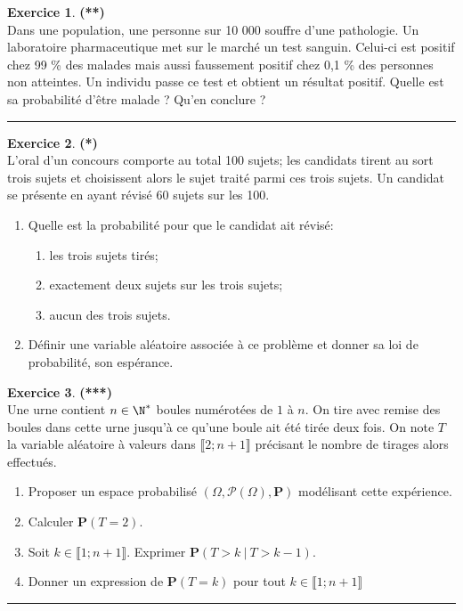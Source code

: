 \documentclass[a4paper,11pt]{article}
\theoremstyle{definition}
\newtheorem{exo}{Exercice} %
\newcommand{\Pb}{\mathbf{P}}
\begin{document}
\begin{exo}\textbf{(**)}\quad\\[0.15cm]%
	Dans une population, une personne sur 10 000 souffre d'une pathologie. Un
	laboratoire pharmaceutique met sur le marché un test sanguin. Celui-ci est positif
	chez 99 \% des malades mais aussi faussement positif chez 0,1 \% des personnes non
	atteintes. Un individu passe ce test et obtient un résultat positif.
	Quelle est sa probabilité d'être malade ? Qu'en conclure ?
	
	
	\centering
	\rule{1\linewidth}{0.6pt}
\end{exo}


\begin{exo}\textbf{(*)}\quad\\[0.15cm]%
	L'oral d'un concours comporte au total 100 sujets; les candidats
	tirent au sort trois sujets et choisissent alors le sujet traité parmi
	ces trois sujets. Un candidat se présente en ayant révisé 60
	sujets sur les 100.
	\begin{enumerate}
		\item Quelle est la probabilité pour que le candidat ait révisé:
		\begin{enumerate}
			\item les trois sujets tirés;
			\item exactement deux sujets sur les trois sujets;
			\item aucun des trois sujets.
		\end{enumerate}
		\item Définir une variable aléatoire associée à ce problème 
		et donner sa loi de probabilité, son espérance.
	\end{enumerate}
	
\end{exo}


\begin{exo}\textbf{(***)}\quad\\[0.25cm]%
	Une urne contient $n \in \N^*$ boules numérotées de $1$ à $n $. On tire avec remise des
	boules dans cette urne jusqu'à ce qu'une boule ait été tirée deux fois. On note $T$
	la variable aléatoire à valeurs dans $\llbracket2 ; n + 1\rrbracket$ précisant le nombre de tirages alors	effectués.
	\begin{enumerate}
		\item Proposer un espace probabilisé $(\Omega, \mathcal P(\Omega),\Pb)$ modélisant cette expérience.
		\item Calculer $\Pb(T = 2) $.
		\item Soit $k \in \llbracket1 ; n + 1\rrbracket$. Exprimer $\Pb(T > k \ | \ T > k - 1)$.
		\item Donner un expression de $\Pb(T = k)$ pour tout $k \in \llbracket1 ; n + 1\rrbracket$
	\end{enumerate}

	
	\centering
	\rule{1\linewidth}{0.6pt}
\end{exo}
\end{document}
